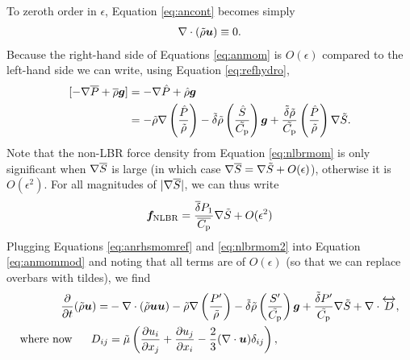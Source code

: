\documentclass[12pt]{article}
\begin{document}
To zeroth order in $\epsilon$, Equation \eqref{eq:ancont} becomes simply
\begin{align}\label{eq:ancontref}
	\nabla\cdot(\tilde{\rho}\bm{u})\equiv0.
\end{align}
Because the right-hand side of Equations \eqref{eq:anmom} is $O(\epsilon)$ compared to the left-hand side we can write, using Equation \eqref{eq:refhydro},
\begin{align}\label{eq:anrhsmomref}
	[-\nabla \overline{P} + \overline{\rho}\bm{g}] &= -\nabla \hat{P} + \hat{\rho}\bm{g}\nonumber\\
	&= -\tilde{\rho}\nabla\left(\frac{\hat{P}}{\tilde{\rho}}\right) - \tilde{\delta} \tilde{\rho} \left(\frac{\hat{S}}{\tilde{C_{\rm{p}}}}\right) \bm{g} + \frac{\tilde{\delta}\tilde{\rho}}{\tilde{C_{\rm{p}}}} \left(\frac{\hat{P}}{\tilde{\rho}}\right)\nabla\tilde{S}.
\end{align}
Note that the non-LBR force density from Equation \eqref{eq:nlbrmom} is only significant when $\nabla\overline{S}$ is large (in which case $\nabla\overline{S}=\nabla\tilde{S}+O(\epsilon)$), otherwise it is $O(\epsilon^2)$. For all magnitudes of $|\nabla\overline{S}|$, we can thus write
\begin{align}\label{eq:nlbrmom2}
	\bm{f}_{\rm NLBR} = \frac{\overline{\delta} P_1}{\overline{C_{\rm{p}}}} \nabla\tilde{S} + O(\epsilon^2)
\end{align}
Plugging Equations \eqref{eq:anrhsmomref} and \eqref{eq:nlbrmom2} into Equation \eqref{eq:anmommod} and noting that all terms are of $O(\epsilon)$ (so that we can replace overbars with tildes), we find
\begin{subequations}\label{eq:anmomref}
	\begin{align}\label{eq:anmomrefmain}
	\frac{\partial}{\partial t}(\tilde{\rho}\bm{u})= &-\nabla\cdot(\tilde{\rho}\bm{u}\bm{u}) -\tilde{\rho}\nabla\left(\frac{P^\prime}{\tilde{\rho}}\right) - \tilde{\delta}\tilde{\rho} \left(\frac{S^\prime}{\tilde{C_{\rm{p}}}}\right) \bm{g} +\frac{\tilde{\delta} P^\prime}{\tilde{C_{\rm{p}}}} \nabla\tilde{S}+\nabla\cdot \overleftrightarrow{D},\\
	\text{where now}\ \ \ \ \  D_{ij}& = \tilde{\mu}\left(\frac{\partial u_i}{\partial x_j} + \frac{\partial u_j}{\partial x_i} - \frac{2}{3}(\nabla\cdot\bm{u})\delta_{ij}\right)\label{eq:anmomrefvisc},
\end{align}
\end{subequations}
\end{document}
